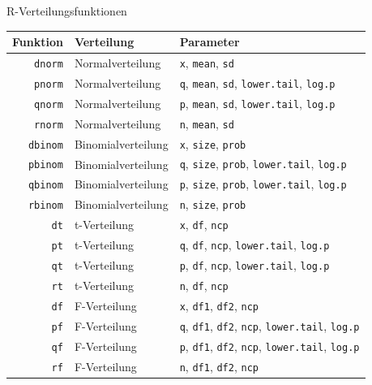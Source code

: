 \begin{formulaBox}{R-Verteilungsfunktionen}{}

\begin{tabular}{@{}rll@{}}
\toprule
\textbf{Funktion} & \textbf{Verteilung}  & \textbf{Parameter} \\ \midrule
\texttt{dnorm}      & Normalverteilung     & \texttt{x}, \texttt{mean}, \texttt{sd} \\ 
\texttt{pnorm}      & Normalverteilung     & \texttt{q}, \texttt{mean}, \texttt{sd}, \texttt{lower.tail}, \texttt{log.p} \\ 
\texttt{qnorm}      & Normalverteilung     & \texttt{p}, \texttt{mean}, \texttt{sd}, \texttt{lower.tail}, \texttt{log.p} \\ 
\texttt{rnorm}      & Normalverteilung     & \texttt{n}, \texttt{mean}, \texttt{sd} \\ 
\texttt{dbinom}     & Binomialverteilung   & \texttt{x}, \texttt{size}, \texttt{prob} \\ 
\texttt{pbinom}     & Binomialverteilung   & \texttt{q}, \texttt{size}, \texttt{prob}, \texttt{lower.tail}, \texttt{log.p} \\ 
\texttt{qbinom}     & Binomialverteilung   & \texttt{p}, \texttt{size}, \texttt{prob}, \texttt{lower.tail}, \texttt{log.p} \\ 
\texttt{rbinom}     & Binomialverteilung   & \texttt{n}, \texttt{size}, \texttt{prob} \\ 
\texttt{dt}         & t-Verteilung         & \texttt{x}, \texttt{df}, \texttt{ncp} \\ 
\texttt{pt}         & t-Verteilung         & \texttt{q}, \texttt{df}, \texttt{ncp}, \texttt{lower.tail}, \texttt{log.p} \\ 
\texttt{qt}         & t-Verteilung         & \texttt{p}, \texttt{df}, \texttt{ncp}, \texttt{lower.tail}, \texttt{log.p} \\ 
\texttt{rt}         & t-Verteilung         & \texttt{n}, \texttt{df}, \texttt{ncp} \\ 
\texttt{df}         & F-Verteilung         & \texttt{x}, \texttt{df1}, \texttt{df2}, \texttt{ncp} \\ 
\texttt{pf}         & F-Verteilung         & \texttt{q}, \texttt{df1}, \texttt{df2}, \texttt{ncp}, \texttt{lower.tail}, \texttt{log.p} \\ 
\texttt{qf}         & F-Verteilung         & \texttt{p}, \texttt{df1}, \texttt{df2}, \texttt{ncp}, \texttt{lower.tail}, \texttt{log.p} \\ 
\texttt{rf}         & F-Verteilung         & \texttt{n}, \texttt{df1}, \texttt{df2}, \texttt{ncp} \\ 
\bottomrule
\end{tabular}


\end{formulaBox}
